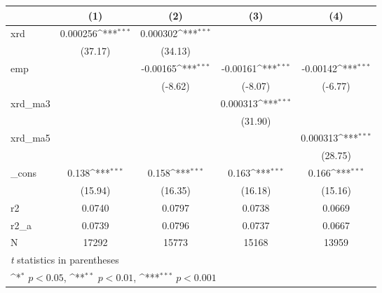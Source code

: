 {
\def\sym#1{\ifmmode^{#1}\else\(^{#1}\)\fi}
\begin{tabular}{l*{4}{c}}
\hline\hline
            &\multicolumn{1}{c}{(1)}         &\multicolumn{1}{c}{(2)}         &\multicolumn{1}{c}{(3)}         &\multicolumn{1}{c}{(4)}         \\
\hline
xrd         &    0.000256\sym{***}&    0.000302\sym{***}&                     &                     \\
            &     (37.17)         &     (34.13)         &                     &                     \\
[1em]
emp         &                     &    -0.00165\sym{***}&    -0.00161\sym{***}&    -0.00142\sym{***}\\
            &                     &     (-8.62)         &     (-8.07)         &     (-6.77)         \\
[1em]
xrd\_ma3     &                     &                     &    0.000313\sym{***}&                     \\
            &                     &                     &     (31.90)         &                     \\
[1em]
xrd\_ma5     &                     &                     &                     &    0.000313\sym{***}\\
            &                     &                     &                     &     (28.75)         \\
[1em]
\_cons      &       0.138\sym{***}&       0.158\sym{***}&       0.163\sym{***}&       0.166\sym{***}\\
            &     (15.94)         &     (16.35)         &     (16.18)         &     (15.16)         \\
\hline
r2          &      0.0740         &      0.0797         &      0.0738         &      0.0669         \\
r2\_a        &      0.0739         &      0.0796         &      0.0737         &      0.0667         \\
N           &       17292         &       15773         &       15168         &       13959         \\
\hline\hline
\multicolumn{5}{l}{\footnotesize \textit{t} statistics in parentheses}\\
\multicolumn{5}{l}{\footnotesize \sym{*} \(p<0.05\), \sym{**} \(p<0.01\), \sym{***} \(p<0.001\)}\\
\end{tabular}
}
